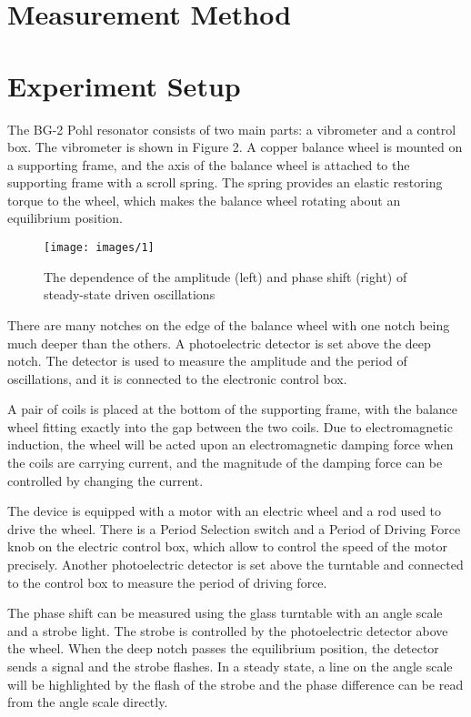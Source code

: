 \section{Measurement Method}
\section{Experiment Setup}
The BG-2 Pohl resonator consists of two main parts: a vibrometer and a control
box. The vibrometer is shown in Figure 2. A copper balance wheel is mounted on a
supporting frame, and the axis of the balance wheel is attached to the
supporting frame with a scroll spring. The spring provides an elastic restoring
torque to the wheel, which makes the balance wheel rotating about an equilibrium
position. 
    \begin{figure}[H]
    \centering
        \texttt{[image: images/1]}
        \caption{The dependence of the amplitude (left) and phase shift (right) of steady-state driven oscillations}\label{aps}
    \end{figure}
    There are many notches on the edge of the balance wheel with one notch being much deeper than the others. A photoelectric detector is set above the deep notch. The detector is used to measure the amplitude and the period of oscillations, and it is connected to the electronic control box.

    A pair of coils is placed at the bottom of the supporting frame, with the balance wheel fitting exactly into the gap between the two coils. Due to electromagnetic induction, the wheel will be acted upon an electromagnetic damping force when the coils are carrying current, and the magnitude of the damping force can be controlled by changing the current.

    The device is equipped with a motor with an electric wheel and a rod used to drive the wheel. There is a Period Selection switch and a Period of Driving Force knob on the electric control box, which allow to control the speed of the motor precisely. Another photoelectric detector is set above the turntable and connected to the control box to measure the period of driving force.

    The phase shift can be measured using the glass turntable with an angle scale and a strobe light. The strobe is controlled by the photoelectric detector above the wheel. When the deep notch passes the equilibrium position, the detector sends a signal and the strobe flashes. In a steady state, a line on the angle scale will be highlighted by the flash of the strobe and the phase difference can be read from the angle scale directly.

